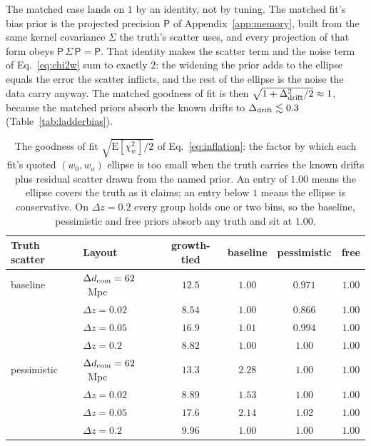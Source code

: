 \documentclass[11pt]{article}
\newcommand{\Prec}{\mathsf{P}}
\begin{document}
The matched case lands on $1$ by an identity, not by tuning.  The
matched fit's bias prior is the projected precision $\Prec$ of
Appendix~\ref{app:memory}, built from the same kernel covariance
$\Sigma$ the truth's scatter uses, and every projection of that form
obeys $\Prec\,\Sigma\,\Prec = \Prec$.  That identity makes the
scatter term and the noise term of Eq.~\eqref{eq:chi2w} sum to
exactly $2$: the widening the prior adds to the ellipse equals the
error the scatter inflicts, and the rest of the ellipse is the noise
the data carry anyway.  The matched goodness of fit is then
$\sqrt{1 + \Delta_{\rm drift}^2/2} \approx 1$, because the matched
priors absorb the known drifts to $\Delta_{\rm drift} \lesssim 0.3$
(Table~\ref{tab:ladderbias}).

\begin{table}[ht]
  \centering
  \begin{tabular}{llcccc}
    \hline
    Truth scatter & Layout & growth-tied & baseline & pessimistic &
    free \\
    \hline
    baseline & $\Delta d_{\rm com} = 62$~Mpc &
    $12.5$ & $1.00$ & $0.971$ & $1.00$ \\
    & $\Delta z = 0.02$ & $8.54$ & $1.00$ & $0.866$ & $1.00$ \\
    & $\Delta z = 0.05$ & $16.9$ & $1.01$ & $0.994$ & $1.00$ \\
    & $\Delta z = 0.2$  & $8.82$ & $1.00$ & $1.00$ & $1.00$ \\
    \hline
    pessimistic & $\Delta d_{\rm com} = 62$~Mpc &
    $13.3$ & $2.28$ & $1.00$ & $1.00$ \\
    & $\Delta z = 0.02$ & $8.89$ & $1.53$ & $1.00$ & $1.00$ \\
    & $\Delta z = 0.05$ & $17.6$ & $2.14$ & $1.02$ & $1.00$ \\
    & $\Delta z = 0.2$  & $9.96$ & $1.00$ & $1.00$ & $1.00$ \\
    \hline
  \end{tabular}
  \caption{The goodness of fit $\sqrt{\mathrm{E}[\chi^2_w]/2}$ of
    Eq.~\eqref{eq:inflation}: the factor by which each fit's quoted
    $(w_0, w_a)$ ellipse is too small when the truth carries the
    known drifts plus residual scatter drawn from the named prior.
    An entry of $1.00$ means the ellipse covers the truth as it
    claims; an entry below $1$ means the ellipse is conservative.
    On $\Delta z = 0.2$ every group holds one or two bins, so the
    baseline, pessimistic and free priors absorb any truth and sit at
    $1.00$.}
  \label{tab:inflation}
\end{table}
\end{document}
